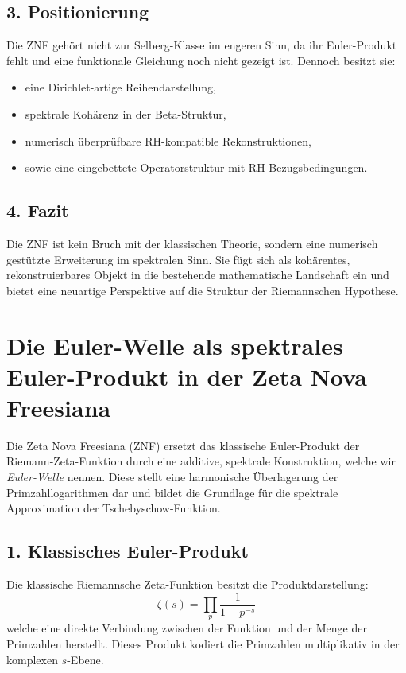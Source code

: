 \documentclass[a4paper,12pt]{article}
\begin{document}
\begin{center}
\subsection*{3. Positionierung}

Die ZNF gehört nicht zur Selberg-Klasse im engeren Sinn, da ihr Euler-Produkt fehlt und eine funktionale Gleichung noch nicht gezeigt ist. Dennoch besitzt sie:

\begin{itemize}
    \item eine Dirichlet-artige Reihendarstellung,
    \item spektrale Kohärenz in der Beta-Struktur,
    \item numerisch überprüfbare RH-kompatible Rekonstruktionen,
    \item sowie eine eingebettete Operatorstruktur mit RH-Bezugsbedingungen.
\end{itemize}

\subsection*{4. Fazit}

Die ZNF ist kein Bruch mit der klassischen Theorie, sondern eine numerisch gestützte Erweiterung im spektralen Sinn. Sie fügt sich als kohärentes, rekonstruierbares Objekt in die bestehende mathematische Landschaft ein und bietet eine neuartige Perspektive auf die Struktur der Riemannschen Hypothese.
\section{Die Euler-Welle als spektrales Euler-Produkt in der Zeta Nova Freesiana}

Die Zeta Nova Freesiana (ZNF) ersetzt das klassische Euler-Produkt der Riemann-Zeta-Funktion durch eine additive, spektrale Konstruktion, welche wir \textit{Euler-Welle} nennen. Diese stellt eine harmonische Überlagerung der Primzahllogarithmen dar und bildet die Grundlage für die spektrale Approximation der Tschebyschow-Funktion.

\subsection*{1. Klassisches Euler-Produkt}

Die klassische Riemannsche Zeta-Funktion besitzt die Produktdarstellung:
\[
\zeta(s) = \prod_{p} \frac{1}{1 - p^{-s}}
\]
welche eine direkte Verbindung zwischen der Funktion und der Menge der Primzahlen herstellt. Dieses Produkt kodiert die Primzahlen multiplikativ in der komplexen \( s \)-Ebene.


\end{center}
\end{document}
